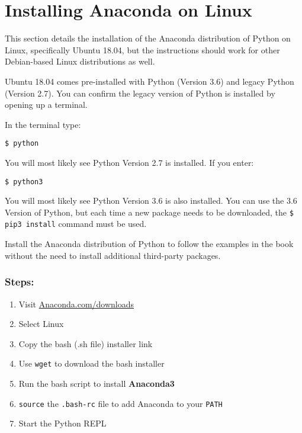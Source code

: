 \documentclass{book}
\newcommand{\passthrough}[1]{#1}
\begin{document}
    
        \hypertarget{installing-anaconda-on-linux}{%
\section{Installing Anaconda on
Linux}\label{installing-anaconda-on-linux}}
    




    
        This section details the installation of the Anaconda distribution of
Python on Linux, specifically Ubuntu 18.04, but the instructions should
work for other Debian-based Linux distributions as well.

Ubuntu 18.04 comes pre-installed with Python (Version 3.6) and legacy
Python (Version 2.7). You can confirm the legacy version of Python is
installed by opening up a terminal.

In the terminal type:

\begin{lstlisting}
$ python
\end{lstlisting}

You will most likely see Python Version 2.7 is installed. If you enter:

\begin{lstlisting}
$ python3
\end{lstlisting}

You will most likely see Python Version 3.6 is also installed. You can
use the 3.6 Version of Python, but each time a new package needs to be
downloaded, the \passthrough{\lstinline!$ pip3 install!} command must be
used.

Install the Anaconda distribution of Python to follow the examples in
the book without the need to install additional third-party packages.
    




    
        \hypertarget{steps}{%
\subsubsection{Steps:}\label{steps}}

\begin{enumerate}
\def\labelenumi{\arabic{enumi}.}
\item
  Visit
  \href{https://www.anaconda.com/download/}{Anaconda.com/downloads}
\item
  Select Linux
\item
  Copy the bash (.sh file) installer link
\item
  Use \passthrough{\lstinline!wget!} to download the bash installer
\item
  Run the bash script to install \textbf{Anaconda3}
\item
  \passthrough{\lstinline!source!} the
  \passthrough{\lstinline!.bash-rc!} file to add Anaconda to your
  \passthrough{\lstinline!PATH!}
\item
  Start the Python REPL
\end{enumerate}
    
\end{document}
